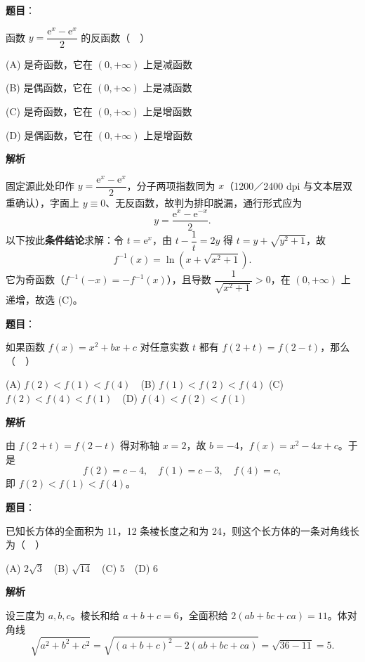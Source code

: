 \begin{answer}

\textbf{题目}：

函数 \(y=\dfrac{\mathrm{e}^x-\mathrm{e}^x}{2}\) 的反函数（　）

(A) 是奇函数，它在 \((0,+\infty)\) 上是减函数

(B) 是偶函数，它在 \((0,+\infty)\) 上是减函数

(C) 是奇函数，它在 \((0,+\infty)\) 上是增函数

(D) 是偶函数，它在 \((0,+\infty)\) 上是增函数

\textbf{解析}

固定源此处印作 \(y=\dfrac{\mathrm{e}^{x}-\mathrm{e}^{x}}{2}\)，分子两项指数同为 \(x\)（1200／2400 dpi 与文本层双重确认），字面上 \(y\equiv0\)、无反函数，故判为排印脱漏，通行形式应为
\nopagebreak[4]
\[
y=\frac{\mathrm{e}^{x}-\mathrm{e}^{-x}}{2}.
\]
以下按此\textbf{条件结论}求解：令 \(t=\mathrm{e}^x\)，由 \(t-\dfrac1t=2y\) 得 \(t=y+\sqrt{y^2+1}\)，故
\nopagebreak[4]
\[
f^{-1}(x)=\ln\left(x+\sqrt{x^2+1}\right).
\]
它为奇函数（\(f^{-1}(-x)=-f^{-1}(x)\)），且导数 \(\dfrac{1}{\sqrt{x^2+1}}>0\)，在 \((0,+\infty)\) 上递增，故选 (C)。


\end{answer}
\begin{answer}

\textbf{题目}：

如果函数 \(f(x)=x^2+bx+c\) 对任意实数 \(t\) 都有 \(f(2+t)=f(2-t)\)，那么（　）

(A) \(f(2)<f(1)<f(4)\)　(B) \(f(1)<f(2)<f(4)\)
(C) \(f(2)<f(4)<f(1)\)　(D) \(f(4)<f(2)<f(1)\)

\textbf{解析}

由 \(f(2+t)=f(2-t)\) 得对称轴 \(x=2\)，故 \(b=-4\)，\(f(x)=x^2-4x+c\)。于是
\nopagebreak[4]
\[
f(2)=c-4,\quad f(1)=c-3,\quad f(4)=c,
\]
即 \(f(2)<f(1)<f(4)\)。


\end{answer}
\begin{answer}

\textbf{题目}：

已知长方体的全面积为 11，12 条棱长度之和为 24，则这个长方体的一条对角线长为（　）

(A) \(2\sqrt{3}\)　(B) \(\sqrt{14}\)　(C) \(5\)　(D) \(6\)

\textbf{解析}

设三度为 \(a,b,c\)。棱长和给 \(a+b+c=6\)，全面积给 \(2(ab+bc+ca)=11\)。体对角线
\nopagebreak[4]
\[
\sqrt{a^2+b^2+c^2}
=\sqrt{(a+b+c)^2-2(ab+bc+ca)}
=\sqrt{36-11}=5.
\]


\end{answer}
